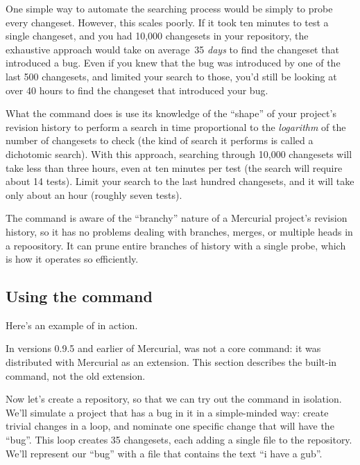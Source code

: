 One simple way to automate the searching process would be simply to
probe every changeset.  However, this scales poorly.  If it took ten
minutes to test a single changeset, and you had 10,000 changesets in
your repository, the exhaustive approach would take on average~35
\emph{days} to find the changeset that introduced a bug.  Even if you
knew that the bug was introduced by one of the last 500 changesets,
and limited your search to those, you'd still be looking at over 40
hours to find the changeset that introduced your bug.

What the  command does is use its knowledge of the
``shape'' of your project's revision history to perform a search in
time proportional to the \emph{logarithm} of the number of changesets
to check (the kind of search it performs is called a dichotomic
search).  With this approach, searching through 10,000 changesets will
take less than three hours, even at ten minutes per test (the search
will require about 14 tests).  Limit your search to the last hundred
changesets, and it will take only about an hour (roughly seven tests).

The  command is aware of the ``branchy'' nature of a
Mercurial project's revision history, so it has no problems dealing
with branches, merges, or multiple heads in a repoository.  It can
prune entire branches of history with a single probe, which is how it
operates so efficiently.

\subsection{Using the  command}

Here's an example of  in action.

\begin{note}
  In versions 0.9.5 and earlier of Mercurial,  was not a
  core command: it was distributed with Mercurial as an extension.
  This section describes the built-in command, not the old extension.
\end{note}

Now let's create a repository, so that we can try out the
 command in isolation.
We'll simulate a project that has a bug in it in a simple-minded way:
create trivial changes in a loop, and nominate one specific change
that will have the ``bug''.  This loop creates 35 changesets, each
adding a single file to the repository.  We'll represent our ``bug''
with a file that contains the text ``i have a gub''.

